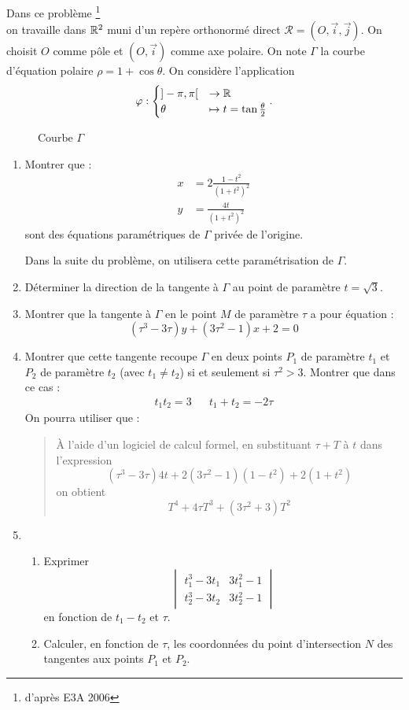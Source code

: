 Dans ce problème \footnote{d'après E3A 2006}\\ on travaille dans $\mathbb{R}^2$ muni d'un repère
orthonormé direct
$\mathcal{R}=(O,\overrightarrow{i},\overrightarrow{j})$. On choisit
$O$ comme pôle et $(O,\overrightarrow{i})$ comme axe polaire. On
note $\Gamma$  la courbe d'équation polaire
  $\rho=1+\cos \theta$.
  On considère l'application
  $$\varphi : \begin{cases}]-\pi,\pi[ &\rightarrow \mathbb{R} \\ \theta &\mapsto t=\tan\frac\theta2 \end{cases}.$$
\begin{figure}
	\centering
	
	\caption{Courbe $\Gamma$}
\end{figure}

\begin{enumerate}
  \item Montrer que :
\begin{align*}
 x &=2\frac{1-t^2}{(1+t^2)^2} \\
  y &=\frac{4t}{(1+t^2)^2}
\end{align*}
  sont des équations paramétriques de $\Gamma$ privée de l'origine.

Dans la suite du problème, on utilisera cette paramétrisation de $\Gamma$.
  \item Déterminer la direction de la tangente à $\Gamma$ au point de paramètre $t=\sqrt 3$.
  \item  Montrer que la tangente à $\Gamma$ en le point $M$ de   paramètre $\tau$ a pour équation :
\begin{displaymath}
 (\tau^3-3\tau)y+(3\tau^2-1)x+2=0
\end{displaymath}

  \item Montrer que cette tangente recoupe $\Gamma$ en deux  points  $P _1$ de paramètre $t_1$ et $P_2$ de paramètre $t_2$ (avec $t_1\neq t_2$) si et seulement si $\tau^2> 3$. Montrer que dans ce cas :
\begin{align*}
 t_1t_2=3 & & t_1+t_2=-2\tau
\end{align*}
On pourra utiliser que :
\begin{quotation}
 \`A l'aide d'un logiciel de calcul formel, en substituant $\tau +T$ à $t$ dans l'expression
\[(\tau^3-3\tau)4t+2(3\tau^2-1)(1-t^2)+2(1+t^2)\]
on obtient
\[T^4+4\tau T^3+(3\tau^2+3)T^2\]
\end{quotation}
  \item \begin{enumerate}
          \item Exprimer
\begin{displaymath}
 \begin{vmatrix}
    t_1^3-3t_1 & 3t_1^2-1 \\
    t_2^3-3t_2 & 3t_2^2-1
 \end{vmatrix}
\end{displaymath}
 en fonction de $t_1-t_2$ et $\tau$.
 \item Calculer, en fonction de $\tau$, les coordonnées du point d'intersection $N$ des tangentes aux points $P_1$ et $P_2$.
\end{enumerate}


\end{enumerate}
